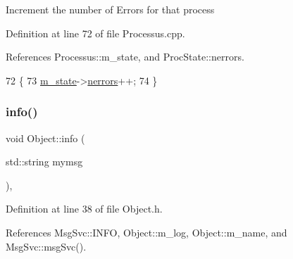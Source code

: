 Increment the number of Errors for that process 

Definition at line 72 of file Processus.\+cpp.



References Processus\+::m\+\_\+state, and Proc\+State\+::nerrors.


\begin{DoxyCode}
72                            \{
73   \hyperlink{classProcessus_ab3539eee42891ceae0baf4395ae7fb61}{m\_state}->\hyperlink{structProcState_a51a0f54ba62b07e07ac8518c5f32828d}{nerrors}++;
74 \}
\end{DoxyCode}
\mbox{\label{classObject_a644fd329ea4cb85f54fa6846484b84a8}} 
\subsubsection{\texorpdfstring{info()}{info()}\hspace{0.1cm}{\footnotesize\ttfamily [1/2]}}
{\footnotesize\ttfamily void Object\+::info (\begin{DoxyParamCaption}\item[{std\+::string}]{mymsg }\end{DoxyParamCaption})\hspace{0.3cm}{\ttfamily [inline]}, {\ttfamily [inherited]}}



Definition at line 38 of file Object.\+h.



References Msg\+Svc\+::\+I\+N\+FO, Object\+::m\+\_\+log, Object\+::m\+\_\+name, and Msg\+Svc\+::msg\+Svc().



